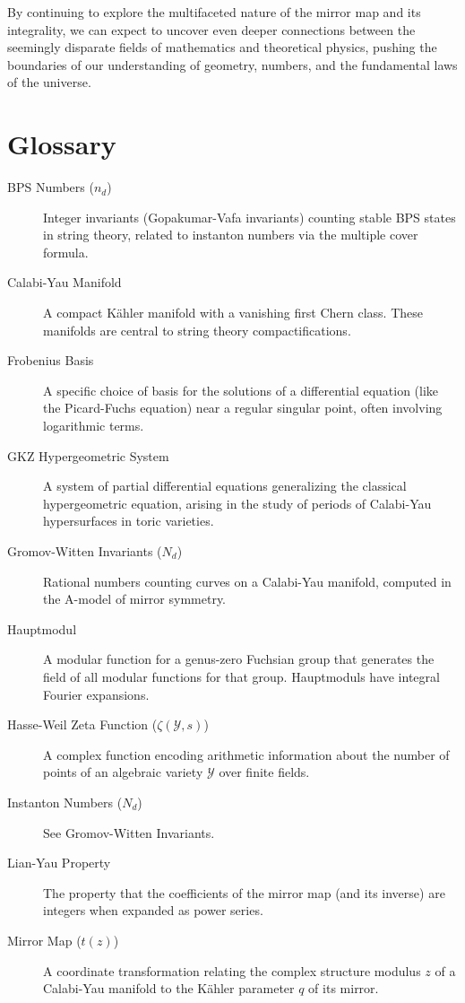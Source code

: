 \documentclass{book}
\newcommand{\calY}{\mathcal{Y}} %
\newcommand{\qexp}{q} %
\newcommand{\zmod}{z} %
\newcommand{\tmap}{t} %
\newcommand{\Nd}{N_d} %
\newcommand{\nd}{n_d} %
\newcommand{\Zeta}{\zeta} %
\theoremstyle{definition}
\begin{document}
By continuing to explore the multifaceted nature of the mirror map and its integrality, we can expect to uncover even deeper connections between the seemingly disparate fields of mathematics and theoretical physics, pushing the boundaries of our understanding of geometry, numbers, and the fundamental laws of the universe.

\chapter*{Glossary}
\begin{description}
    \item[BPS Numbers ($\nd$)] Integer invariants (Gopakumar-Vafa invariants) counting stable BPS states in string theory, related to instanton numbers via the multiple cover formula.
    \item[Calabi-Yau Manifold] A compact K\"ahler manifold with a vanishing first Chern class. These manifolds are central to string theory compactifications.
    \item[Frobenius Basis] A specific choice of basis for the solutions of a differential equation (like the Picard-Fuchs equation) near a regular singular point, often involving logarithmic terms.
    \item[GKZ Hypergeometric System] A system of partial differential equations generalizing the classical hypergeometric equation, arising in the study of periods of Calabi-Yau hypersurfaces in toric varieties.
    \item[Gromov-Witten Invariants ($\Nd$)] Rational numbers counting curves on a Calabi-Yau manifold, computed in the A-model of mirror symmetry.
    \item[Hauptmodul] A modular function for a genus-zero Fuchsian group that generates the field of all modular functions for that group. Hauptmoduls have integral Fourier expansions.
    \item[Hasse-Weil Zeta Function ($\Zeta(\calY, s)$)] A complex function encoding arithmetic information about the number of points of an algebraic variety $\calY$ over finite fields.
    \item[Instanton Numbers ($\Nd$)] See Gromov-Witten Invariants.
    \item[Lian-Yau Property] The property that the coefficients of the mirror map (and its inverse) are integers when expanded as power series.
    \item[Mirror Map ($\tmap(\zmod)$)] A coordinate transformation relating the complex structure modulus $\zmod$ of a Calabi-Yau manifold to the K\"ahler parameter $\qexp$ of its mirror.

\end{description}
\end{document}
